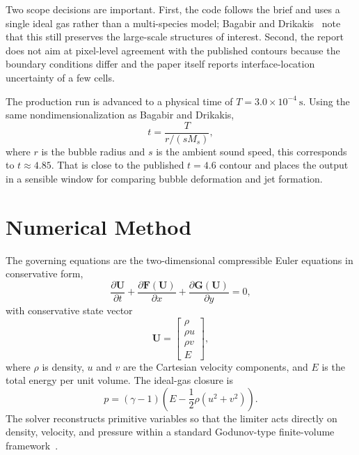 \documentclass[final,3p,times,twocolumn]{elsarticle}
\begin{document}
Two scope decisions are important. First, the code follows the brief and uses a single ideal gas rather than a multi-species model; Bagabir and Drikakis~\cite{bagabir2001} note that this still preserves the large-scale structures of interest. Second, the report does not aim at pixel-level agreement with the published contours because the boundary conditions differ and the paper itself reports interface-location uncertainty of a few cells.

The production run is advanced to a physical time of $T = 3.0 \times 10^{-4}~\mathrm{s}$. Using the same nondimensionalization as Bagabir and Drikakis,
\begin{equation}
t = \frac{T}{r/(s M_s)},
\end{equation}
where $r$ is the bubble radius and $s$ is the ambient sound speed, this corresponds to $t \approx 4.85$. That is close to the published $t = 4.6$ contour and places the output in a sensible window for comparing bubble deformation and jet formation.

\section{Numerical Method}

The governing equations are the two-dimensional compressible Euler equations in conservative form,
\begin{equation}
\frac{\partial \mathbf{U}}{\partial t} +
\frac{\partial \mathbf{F}(\mathbf{U})}{\partial x} +
\frac{\partial \mathbf{G}(\mathbf{U})}{\partial y} = 0,
\end{equation}
with conservative state vector
\begin{equation}
\mathbf{U} =
\begin{bmatrix}
\rho \\
\rho u \\
\rho v \\
E
\end{bmatrix},
\end{equation}
where $\rho$ is density, $u$ and $v$ are the Cartesian velocity components, and $E$ is the total energy per unit volume. The ideal-gas closure is
\begin{equation}
p = (\gamma - 1)\left(E - \frac{1}{2}\rho(u^2 + v^2)\right).
\end{equation}
The solver reconstructs primitive variables so that the limiter acts directly on density, velocity, and pressure within a standard Godunov-type finite-volume framework~\cite{harten1983}.
\end{document}

